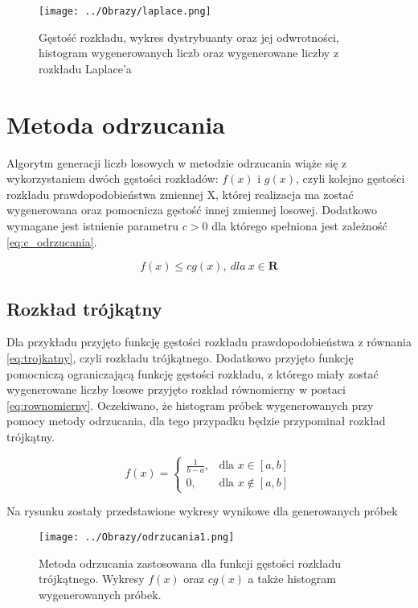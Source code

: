 \documentclass[12pt,a4paper]{article}
\begin{document}
\begin{figure}[H]
\centering
\texttt{[image: ../Obrazy/laplace.png]} 
\caption{Gęstość rozkładu, wykres dystrybuanty oraz jej odwrotności, histogram wygenerowanych liczb oraz wygenerowane liczby z rozkładu Laplace'a}
\label{fig:laplaceL2}
\end{figure}


\section{Metoda odrzucania}
Algorytm generacji liczb losowych w metodzie odrzucania wiąże się z wykorzystaniem dwóch gęstości rozkładów: $f(x)$ i $g(x)$, czyli kolejno gęstości rozkładu prawdopodobieństwa zmiennej X, której realizacja ma zostać wygenerowana oraz pomocnicza gęstość innej zmiennej losowej.
Dodatkowo wymagane jest istnienie parametru $c>0$  dla którego spełniona jest zależność \ref{eq:c_odrzucania}.

\begin{equation}\label{eq:c_odrzucania}
f(x) \leq cg(x),\ dla\ x\in\textbf{R}
\end{equation}

\subsection{Rozkład trójkątny}
Dla przykładu przyjęto funkcję gęstości rozkładu prawdopodobieństwa z równania \ref{eq:trojkatny}, czyli rozkładu trójkątnego.
Dodatkowo przyjęto funkcję pomocniczą ograniczającą funkcję gęstości rozkładu, z którego miały zostać wygenerowane liczby losowe przyjęto rozkład równomierny w postaci \ref{eq:rownomierny}.
Oczekiwano, że histogram próbek wygenerowanych przy pomocy metody odrzucania, dla tego przypadku będzie przypominał rozkład trójkątny.

\begin{equation}\label{eq:rownomierny}
f(x) = \begin{cases} \frac{1}{b-a}, & \mbox{dla } x \in [a,b] \\ 0 , & \mbox{dla } x \not\in [a,b] \end{cases}
\end{equation}

Na rysunku zostały przedstawione wykresy wynikowe dla generowanych próbek

\begin{figure}[H]
\centering
\texttt{[image: ../Obrazy/odrzucania1.png]} 
\caption{Metoda odrzucania zastosowana dla funkcji gęstości rozkładu trójkątnego. Wykresy $f(x)$ oraz $cg(x)$ a także histogram wygenerowanych próbek.}
\label{fig:odrzucania1}
\end{figure}
\end{document}
